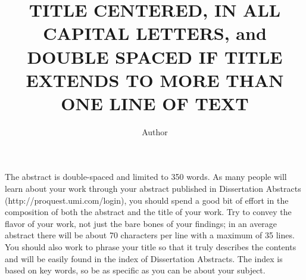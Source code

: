 \documentclass{iuphd}
\begin{document}
\title{TITLE CENTERED, IN ALL CAPITAL LETTERS, and DOUBLE SPACED IF TITLE EXTENDS TO MORE THAN ONE LINE OF TEXT}
\author{Author}
\monthGranted{\DTMmonthname{\month}}
\yearGranted{\the\year}
\maketitle

\acceptancepage


% 


\begin{abstract*}
 The abstract is double-spaced and limited to 350 words. As many people will learn about
your work through your abstract published in Dissertation Abstracts (http://proquest.umi.com/login),
you should spend a good bit of effort in the composition of both the abstract and the title of your work.
Try to convey the flavor of your work, not just the bare bones of your findings; in an average abstract
there will be about 70 characters per line with a maximum of 35 lines. You should also work to phrase your
title so that it truly describes the contents and will be easily found in the index of Dissertation Abstracts.
The index is based on key words, so be as specific as you can be about your subject. 
\end{abstract*}

\tableofcontents






% 
% 
\end{document}
